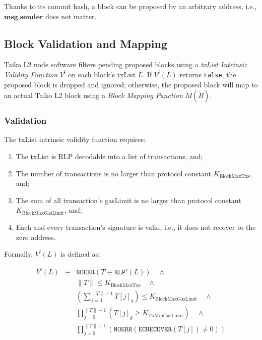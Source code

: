 \documentclass[9pt,oneside]{amsart}
\begin{document}
\begin{multicols}{2}
Thanks to its commit hash, a block can be proposed by an arbitrary address, i.e., $\mathbf{msg.sender}$ dose not matter.

\subsection{Block Validation and Mapping } \label{sec:filtermap}
Taiko L2 node software filters pending proposed blocks using a \textit{txList Intrinsic Validity Function} $V^l$ on each block's txList $L$. If $V^l(L)$ returns \texttt{False}, the proposed block is dropped and ignored; otherwise, the proposed block will map to an actual Taiko L2 block using a \textit{Block Mapping Function} $M(\dot{B})$.

\subsubsection{Validation} The txList intrinsic validity function requires:

\begin{enumerate}
\item The txList is RLP decodable into a list of transactions, and;
\item The number of transactions is no larger than  protocol constant $ K_{\mathrm{BlockMaxTxs}}$, and;
\item The sum of all transaction's gasLimit is no larger than protocol constant $K_{\mathrm{BlockMaxGasLimit}}$, and;
\item Each and every transaction's signature is valid, i.e., it does not recover to the zero address.
\end{enumerate}

Formally, $V^l(L)$ is defined as:


\begin{eqnarray}
V^l(L) & \equiv & \texttt{NOERR}(T \equiv \texttt{RLP}'(L))  \quad \wedge  \\
\nonumber& & \lVert T \rVert \le K_{\mathrm{BlockMaxTxs}} \quad \wedge \\
\nonumber & & (\sum_{j = 0}^{\lVert T \rVert - 1}T[j]_g) \le K_{\mathrm{BlockMaxGasLimit}} \quad \wedge \\
\nonumber & & \prod_{j = 0}^{\lVert T \rVert - 1} (T[j]_g \ge K_{\mathrm{TxMinGasLimit}})\quad \wedge \\
\nonumber & & \prod_{j = 0}^{\lVert T \rVert - 1} (\texttt{NOERR}(\texttt{ECRECOVER}(T[j]) \ne 0) )
\end{eqnarray}


\end{multicols}
\end{document}
